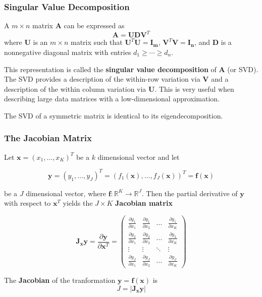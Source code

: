 \documentclass{beamer}
\begin{document}
\begin{frame}
\frametitle{Singular Value Decomposition}
A $m \times n$ matrix $\mathbf{A}$ can be expressed as
$$\mathbf{A} = \mathbf{UDV}^T$$ where $\mathbf{U}$ is an $m \times n$ matrix such that $\mathbf{U}^T\mathbf{U} = \mathbf{I_m}$, $\mathbf{V}^T\mathbf{V} = \mathbf{I_n}$, and $\mathbf{D}$ is a nonnegative diagonal matrix with entries $d_1 \geq \cdots \geq d_n$.
\vspace{5mm}

This representation is called the \textbf{singular value decomposition} of $\mathbf{A}$ (or SVD).  The SVD provides a description of the within-row variation via $\mathbf{V}$ and a description of the within column variation via $\mathbf{U}$.  This is very useful when describing large data matrices with a low-dimensional approximation.

\vspace{5mm}

The SVD of a symmetric matrix is identical to its eigendecomposition.
\end{frame}

\begin{frame}
\frametitle{The Jacobian Matrix}
Let $\mathbf{x} = (x_1, \hdots, x_K)^T$ be a $k$ dimensional vector and let 

\[\mathbf{y} = (y_1, \hdots, y_J)^T = (f_1(\mathbf{x}), \hdots, f_J(\mathbf{x}))^T = \mathbf{f}(\mathbf{x})\]

be a $J$ dimensional vector, where $\mathbf{f}: \mathbb{R}^K \rightarrow \mathbb{R}^J$.  Then the partial derivative of $\mathbf{y}$ with respect to $\mathbf{x}^T$ yields the $J \times K$ \textbf{Jacobian matrix}

\[\mathbf{J_xy} = \frac{\partial \mathbf{y}}{\partial \mathbf{x}^T} 
=
\begin{pmatrix}
    \frac{\partial y_1}{\partial x_1} & \frac{\partial y_1}{\partial x_2} & \dots  & \frac{\partial y_1}{\partial x_K} \\
    \frac{\partial y_2}{\partial x_1} & \frac{\partial y_2}{\partial x_2} & \dots  & \frac{\partial y_2}{\partial x_K}\\
    \vdots & \vdots  & \ddots & \vdots \\
    \frac{\partial y_J}{\partial x_1} & \frac{\partial y_J}{\partial x_2} & \dots  & \frac{\partial y_J}{\partial x_K}
\end{pmatrix}
\]

The \textbf{Jacobian} of the tranformation $\mathbf{y} = \mathbf{f(x)}$ is 
$$J = |\mathbf{J_xy}|$$
\end{frame}
\end{document}
